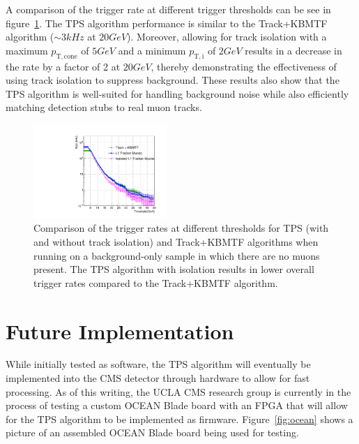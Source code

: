 A comparison of the trigger rate at different trigger thresholds can be see in figure~\ref{fig:rates}.
The TPS algorithm performance is similar to the Track+KBMTF algorithm ($\sim3\unit{kHz}$ at $20\unit{GeV}$).
Moreover, allowing for track isolation with a maximum $p_\mathrm{T,cone}$ of $5\unit{GeV}$ and a minimum $p_{\mathrm{T,i}}$ of $2\unit{GeV}$ results in a decrease in the rate by a factor of 2 at $20\unit{GeV}$, thereby demonstrating the effectiveness of using track isolation to suppress background.
These results also show that the TPS algorithm is well-suited for handling background noise while also efficiently matching detection stubs to real muon tracks.

\begin{figure}[htbp] %
  \centering
  \includegraphics[width=0.45\textwidth]{fig/TPS/rateVsPt_TPSIsol.pdf}
  \caption{
    Comparison of the trigger rates at different \pt thresholds for TPS (with and without track isolation) and Track+KBMTF algorithms when running on a background-only sample in which there are no muons present.
    The TPS algorithm with isolation results in lower overall trigger rates compared to the Track+KBMTF algorithm.
  }
  \label{fig:rates}
\end{figure}

\section{Future Implementation}
\label{subsec:TPSResults}

While initially tested as software, the TPS algorithm will eventually be implemented into the CMS detector through hardware to allow for fast processing.
As of this writing, the UCLA CMS research group is currently in the process of testing a custom OCEAN Blade board with an FPGA that will allow for the TPS algorithm to be implemented as firmware.
Figure~\ref{fig:ocean} shows a picture of an assembled OCEAN Blade board being used for testing.

